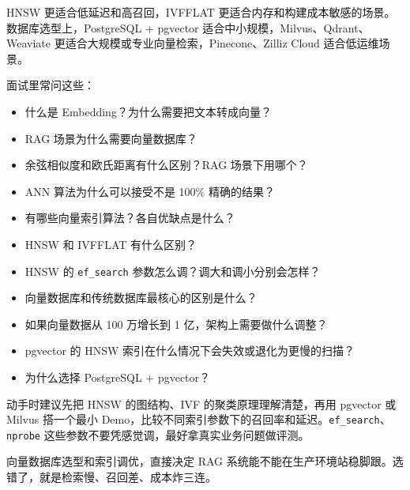 \documentclass[10pt,a4paper]{ctexart}
\begin{document}
HNSW 更适合低延迟和高召回，IVFFLAT 更适合内存和构建成本敏感的场景。数据库选型上，PostgreSQL + pgvector 适合中小规模，Milvus、Qdrant、Weaviate 更适合大规模或专业向量检索，Pinecone、Zilliz Cloud 适合低运维场景。



面试里常问这些：


\begin{itemize}[itemsep=2pt, topsep=4pt]
  \item 什么是 Embedding？为什么需要把文本转成向量？
  \item RAG 场景为什么需要向量数据库？
  \item 余弦相似度和欧氏距离有什么区别？RAG 场景下用哪个？
  \item ANN 算法为什么可以接受不是 100\% 精确的结果？
  \item 有哪些向量索引算法？各自优缺点是什么？
  \item HNSW 和 IVFFLAT 有什么区别？
  \item HNSW 的 \texttt{ef\_search} 参数怎么调？调大和调小分别会怎样？
  \item 向量数据库和传统数据库最核心的区别是什么？
  \item 如果向量数据从 100 万增长到 1 亿，架构上需要做什么调整？
  \item pgvector 的 HNSW 索引在什么情况下会失效或退化为更慢的扫描？
  \item 为什么选择 PostgreSQL + pgvector？
\end{itemize}


动手时建议先把 HNSW 的图结构、IVF 的聚类原理理解清楚，再用 pgvector 或 Milvus 搭一个最小 Demo，比较不同索引参数下的召回率和延迟。\texttt{ef\_search}、\texttt{nprobe} 这些参数不要凭感觉调，最好拿真实业务问题做评测。



向量数据库选型和索引调优，直接决定 RAG 系统能不能在生产环境站稳脚跟。选错了，就是检索慢、召回差、成本炸三连。
\end{document}
